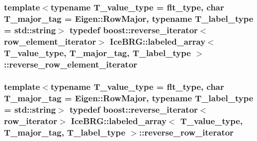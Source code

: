 \subsubsection[{reverse\+\_\+row\+\_\+element\+\_\+iterator}]{\setlength{\rightskip}{0pt plus 5cm}template$<$typename T\+\_\+value\+\_\+type = flt\+\_\+type, char T\+\_\+major\+\_\+tag = Eigen\+::\+Row\+Major, typename T\+\_\+label\+\_\+type = std\+::string$>$ typedef boost\+::reverse\+\_\+iterator$<${\bf row\+\_\+element\+\_\+iterator}$>$ {\bf Ice\+B\+R\+G\+::labeled\+\_\+array}$<$ T\+\_\+value\+\_\+type, T\+\_\+major\+\_\+tag, T\+\_\+label\+\_\+type $>$\+::{\bf reverse\+\_\+row\+\_\+element\+\_\+iterator}}\label{classIceBRG_1_1labeled__array_a00f3c91706206fdb42140d6b2d30839b}
\hypertarget{classIceBRG_1_1labeled__array_a8c245b61b1a5c2d9ea440da50d734676}{}
\subsubsection[{reverse\+\_\+row\+\_\+iterator}]{\setlength{\rightskip}{0pt plus 5cm}template$<$typename T\+\_\+value\+\_\+type = flt\+\_\+type, char T\+\_\+major\+\_\+tag = Eigen\+::\+Row\+Major, typename T\+\_\+label\+\_\+type = std\+::string$>$ typedef boost\+::reverse\+\_\+iterator$<${\bf row\+\_\+iterator}$>$ {\bf Ice\+B\+R\+G\+::labeled\+\_\+array}$<$ T\+\_\+value\+\_\+type, T\+\_\+major\+\_\+tag, T\+\_\+label\+\_\+type $>$\+::{\bf reverse\+\_\+row\+\_\+iterator}}\label{classIceBRG_1_1labeled__array_a8c245b61b1a5c2d9ea440da50d734676}
\hypertarget{classIceBRG_1_1labeled__array_a24ccb02827e9be94dadbcf647c663b03}{}

